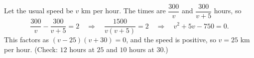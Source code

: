 Let the usual speed be $v$ km per hour. The times are $\dfrac{300}{v}$ and $\dfrac{300}{v+5}$ hours, so
\[
\dfrac{300}{v}-\dfrac{300}{v+5}=2\quad\Longrightarrow\quad \dfrac{1500}{v(v+5)}=2\quad\Longrightarrow\quad v^2+5v-750=0 .
\]
This factors as $(v-25)(v+30)=0$, and the speed is positive, so $v=\boxed{25}$ km per hour. (Check: $12$ hours at $25$ and $10$ hours at $30$.)
